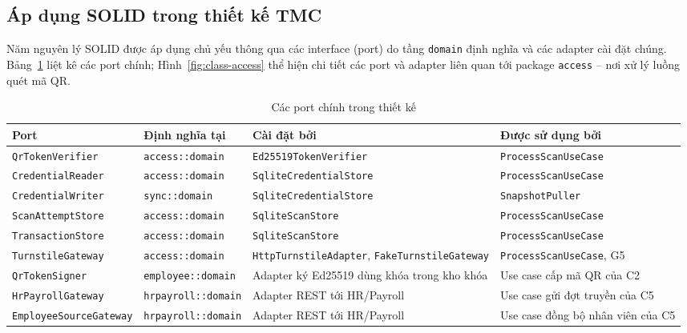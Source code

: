 \subsection{Áp dụng SOLID trong thiết kế TMC}\label{sec:solid}
Năm nguyên lý SOLID được áp dụng chủ yếu thông qua các interface (port) do tầng \texttt{domain} định nghĩa và các adapter cài đặt chúng. Bảng~\ref{tab:ports} liệt kê các port chính; Hình~\ref{fig:class-access} thể hiện chi tiết các port và adapter liên quan tới package \texttt{access} -- nơi xử lý luồng quét mã QR.

\begin{table}[H]
\centering
\caption{Các port chính trong thiết kế}\label{tab:ports}
\small
\renewcommand{\arraystretch}{1.3}
\begin{tabularx}{\textwidth}{|>{\raggedright\arraybackslash}p{4.1cm}|>{\raggedright\arraybackslash}p{3.4cm}|>{\raggedright\arraybackslash}X|>{\raggedright\arraybackslash}p{3.8cm}|}
\hline
\textbf{Port} & \textbf{Định nghĩa tại} & \textbf{Cài đặt bởi} & \textbf{Được sử dụng bởi} \\
\hline
\texttt{QrTokenVerifier} & \texttt{access::domain} & \texttt{Ed25519TokenVerifier} & \texttt{ProcessScanUseCase} \\
\hline
\texttt{CredentialReader} & \texttt{access::domain} & \texttt{SqliteCredentialStore} & \texttt{ProcessScanUseCase} \\
\hline
\texttt{CredentialWriter} & \texttt{sync::domain} & \texttt{SqliteCredentialStore} & \texttt{SnapshotPuller} \\
\hline
\texttt{ScanAttemptStore} & \texttt{access::domain} & \texttt{SqliteScanStore} & \texttt{ProcessScanUseCase} \\
\hline
\texttt{TransactionStore} & \texttt{access::domain} & \texttt{SqliteScanStore} & \texttt{ProcessScanUseCase} \\
\hline
\texttt{TurnstileGateway} & \texttt{access::domain} & \texttt{HttpTurnstileAdapter}, \texttt{FakeTurnstileGateway} & \texttt{ProcessScanUseCase}, G5 \\
\hline
\texttt{QrTokenSigner} & \texttt{employee::domain} & Adapter ký Ed25519 dùng khóa trong kho khóa & Use case cấp mã QR của C2 \\
\hline
\texttt{HrPayrollGateway} & \texttt{hrpayroll::domain} & Adapter REST tới HR/Payroll & Use case gửi đợt truyền của C5 \\
\hline
\texttt{EmployeeSourceGateway} & \texttt{hrpayroll::domain} & Adapter REST tới HR/Payroll & Use case đồng bộ nhân viên của C5 \\
\hline
\end{tabularx}
\end{table}

